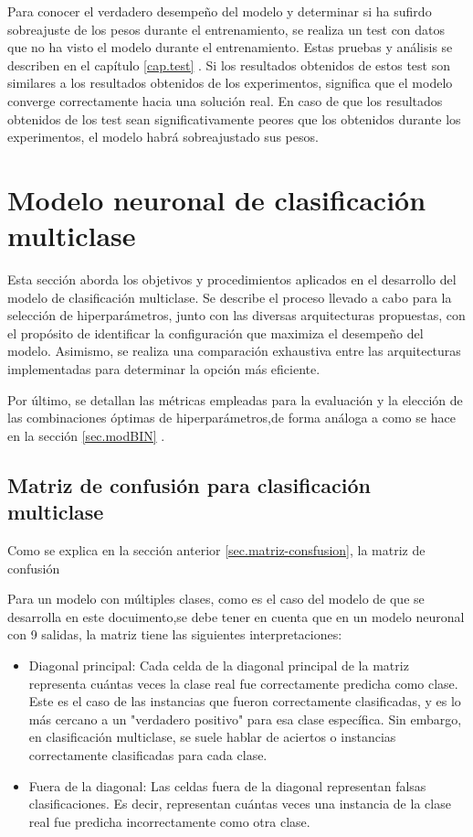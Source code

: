 Para conocer el verdadero desempeño del modelo y determinar si ha sufirdo sobreajuste de los pesos durante el entrenamiento, se realiza un test con datos que no ha visto el modelo durante el entrenamiento. Estas pruebas y análisis se describen en el capítulo \ref{cap.test} . Si los resultados obtenidos de estos test son similares a los resultados obtenidos de los experimentos, significa que el modelo converge correctamente hacia una solución real. En caso de que los resultados obtenidos de los test sean significativamente peores que los obtenidos durante los experimentos, el modelo habrá sobreajustado sus pesos. 

\section{Modelo neuronal de clasificación multiclase}
Esta sección aborda los objetivos y procedimientos aplicados en el desarrollo del modelo de clasificación multiclase. Se describe el proceso llevado a cabo para la selección de hiperparámetros, junto con las diversas arquitecturas propuestas, con el propósito de identificar la configuración que maximiza el desempeño del modelo. Asimismo, se realiza una comparación exhaustiva entre las arquitecturas implementadas para determinar la opción más eficiente.

Por último, se detallan las métricas empleadas para la evaluación y la elección de las combinaciones óptimas de hiperparámetros,de forma análoga a como se hace en la sección \ref{sec.modBIN} .


\subsection{Matriz de confusión para clasificación multiclase} \label{sec.matriz-consfusion-multi}

Como se explica en la sección anterior \ref{sec.matriz-consfusion}, la matriz de confusión 


Para un modelo con múltiples clases, como es el caso del modelo de que se desarrolla en este docuimento,se debe tener en cuenta que en un modelo neuronal con 9 salidas, la matriz tiene las siguientes interpretaciones:
\begin{itemize}
	\item Diagonal principal: Cada celda de la diagonal principal de la matriz representa cuántas veces la clase real fue correctamente predicha como clase. Este es el caso de las instancias que fueron correctamente clasificadas, y es lo más cercano a un "verdadero positivo" para esa clase específica. Sin embargo, en clasificación multiclase, se suele hablar de aciertos o instancias correctamente clasificadas para cada clase.

	\item Fuera de la diagonal: Las celdas fuera de la diagonal representan falsas clasificaciones. Es decir, representan cuántas veces una instancia de la clase real fue predicha incorrectamente como otra clase.

\end{itemize}


